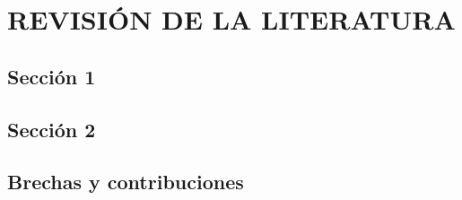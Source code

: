 \chapter{REVISIÓN DE LA LITERATURA}\label{cap:RevisionLiteratura}
    \section{Sección 1}
    \section{Sección 2}
    \section{Brechas y contribuciones}